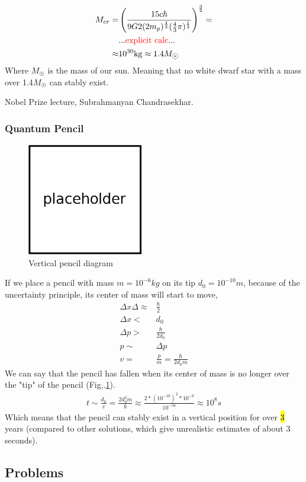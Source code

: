 			\begin{align}
				M_{cr} =& \left( \frac{15 c \hbar}{9 G 2(2m_p)^{\frac{4}{3}}(\frac{4}{3} \pi)^{\frac{1}{3}}} \right)^{\frac{3}{2}} = \\
				&... \hl{\text{explicit calc}} ... \nonumber\\ 
				\approx& 10^{30} \si{kg} \approx 1.4 M_{\astrosun}
			\end{align} 
			Where $M_{\astrosun}$ is the mass of our sun. Meaning that no white dwarf star with a mass over 1.4$M_{\astrosun}$ can stably exist.
			
			Nobel Prize lecture, Subrahmanyan Chandrasekhar\cite{chandrasekhar1984stars}.
		\subsubsection{Quantum Pencil}
			\begin{figure}[!h]
				\centering
				\includegraphics[width=0.45\textwidth]{./figs/placeholder.eps}
				\caption{Vertical pencil diagram}
				\label{pencil}
			\end{figure}
			
			If we place a pencil with mass $m = 10^{-6}\si{kg}$ on its tip $d_0 = 10^{-10}\si{m}$, because of the uncertainty principle, its center of mass will start to move,
			\begin{align}
				\Delta x \Delta \approx& \frac{\hbar}{2} \\
				\Delta x <& d_0 \\
				\Delta p >& \frac{\hbar}{2 d_0} \\
				p \sim& \Delta p \\
				v =& \frac{p}{m} = \frac{\hbar}{2 d_0 m}
			\end{align}
			We can say that the pencil has fallen when its center of mass is no longer over the "tip" of the pencil (Fig,.\ref{pencil}).
			\begin{align}
				t \sim \frac{d_0}{v} = \frac{2d_0^2m}{\hbar} \approx \frac{2 * (10^{-10})^2 * 10^{-6}}{10^{-34}} \approx 10^8 \si{s}
			\end{align}
			Which means that the pencil can stably exist in a vertical position for over \hl{3} years (compared to other solutions, which give unrealistic estimates of about 3 seconds)\cite{easton2007quantum}.
		
	\subsection{Problems}
	